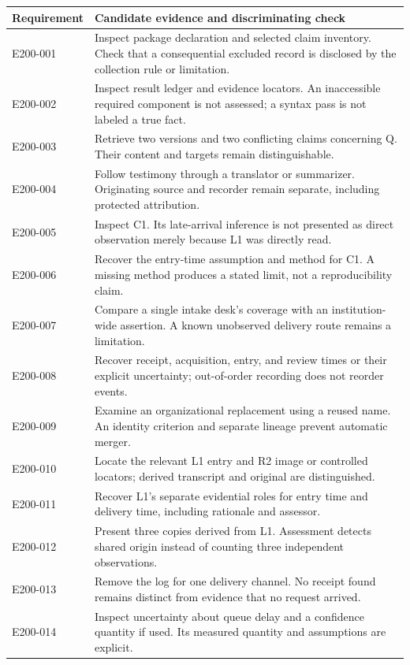 \documentclass[11pt,a4paper]{article}
\begin{document}
\begin{longtable}{@{}L{0.16\textwidth}L{0.78\textwidth}@{}}
\toprule
Requirement & Candidate evidence and discriminating check \\
\midrule\endhead
E200-001 & Inspect package declaration and selected claim inventory. Check that a consequential excluded record is disclosed by the collection rule or limitation. \\
E200-002 & Inspect result ledger and evidence locators. An inaccessible required component is not assessed; a syntax pass is not labeled a true fact. \\
E200-003 & Retrieve two versions and two conflicting claims concerning Q. Their content and targets remain distinguishable. \\
E200-004 & Follow testimony through a translator or summarizer. Originating source and recorder remain separate, including protected attribution. \\
E200-005 & Inspect C1. Its late-arrival inference is not presented as direct observation merely because L1 was directly read. \\
E200-006 & Recover the entry-time assumption and method for C1. A missing method produces a stated limit, not a reproducibility claim. \\
E200-007 & Compare a single intake desk's coverage with an institution-wide assertion. A known unobserved delivery route remains a limitation. \\
E200-008 & Recover receipt, acquisition, entry, and review times or their explicit uncertainty; out-of-order recording does not reorder events. \\
E200-009 & Examine an organizational replacement using a reused name. An identity criterion and separate lineage prevent automatic merger. \\
E200-010 & Locate the relevant L1 entry and R2 image or controlled locators; derived transcript and original are distinguished. \\
E200-011 & Recover L1's separate evidential roles for entry time and delivery time, including rationale and assessor. \\
E200-012 & Present three copies derived from L1. Assessment detects shared origin instead of counting three independent observations. \\
E200-013 & Remove the log for one delivery channel. No receipt found remains distinct from evidence that no request arrived. \\
E200-014 & Inspect uncertainty about queue delay and a confidence quantity if used. Its measured quantity and assumptions are explicit. \\

\end{longtable}
\end{document}
